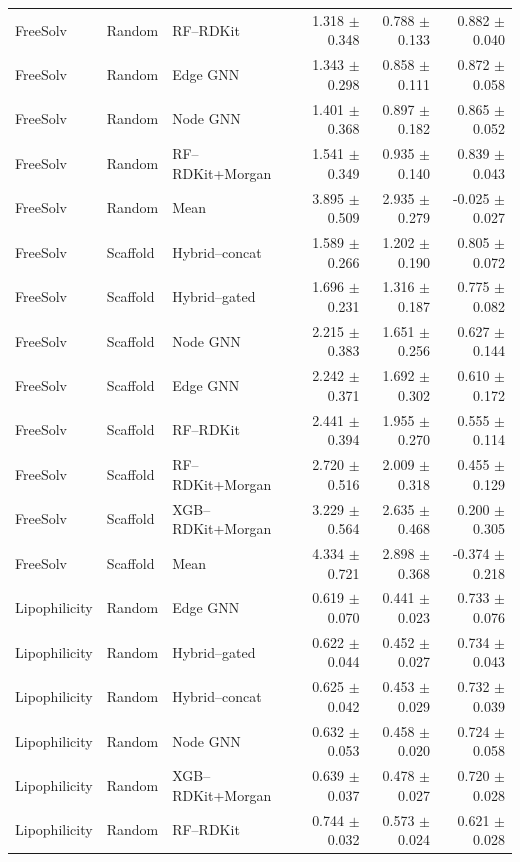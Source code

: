 \begin{tabular}{lllrrr}
FreeSolv & Random & RF--RDKit & 1.318 $\pm$ 0.348 & 0.788 $\pm$ 0.133 & 0.882 $\pm$ 0.040 \\
FreeSolv & Random & Edge GNN & 1.343 $\pm$ 0.298 & 0.858 $\pm$ 0.111 & 0.872 $\pm$ 0.058 \\
FreeSolv & Random & Node GNN & 1.401 $\pm$ 0.368 & 0.897 $\pm$ 0.182 & 0.865 $\pm$ 0.052 \\
FreeSolv & Random & RF--RDKit+Morgan & 1.541 $\pm$ 0.349 & 0.935 $\pm$ 0.140 & 0.839 $\pm$ 0.043 \\
FreeSolv & Random & Mean & 3.895 $\pm$ 0.509 & 2.935 $\pm$ 0.279 & -0.025 $\pm$ 0.027 \\
FreeSolv & Scaffold & Hybrid--concat & 1.589 $\pm$ 0.266 & 1.202 $\pm$ 0.190 & 0.805 $\pm$ 0.072 \\
FreeSolv & Scaffold & Hybrid--gated & 1.696 $\pm$ 0.231 & 1.316 $\pm$ 0.187 & 0.775 $\pm$ 0.082 \\
FreeSolv & Scaffold & Node GNN & 2.215 $\pm$ 0.383 & 1.651 $\pm$ 0.256 & 0.627 $\pm$ 0.144 \\
FreeSolv & Scaffold & Edge GNN & 2.242 $\pm$ 0.371 & 1.692 $\pm$ 0.302 & 0.610 $\pm$ 0.172 \\
FreeSolv & Scaffold & RF--RDKit & 2.441 $\pm$ 0.394 & 1.955 $\pm$ 0.270 & 0.555 $\pm$ 0.114 \\
FreeSolv & Scaffold & RF--RDKit+Morgan & 2.720 $\pm$ 0.516 & 2.009 $\pm$ 0.318 & 0.455 $\pm$ 0.129 \\
FreeSolv & Scaffold & XGB--RDKit+Morgan & 3.229 $\pm$ 0.564 & 2.635 $\pm$ 0.468 & 0.200 $\pm$ 0.305 \\
FreeSolv & Scaffold & Mean & 4.334 $\pm$ 0.721 & 2.898 $\pm$ 0.368 & -0.374 $\pm$ 0.218 \\
Lipophilicity & Random & Edge GNN & 0.619 $\pm$ 0.070 & 0.441 $\pm$ 0.023 & 0.733 $\pm$ 0.076 \\
Lipophilicity & Random & Hybrid--gated & 0.622 $\pm$ 0.044 & 0.452 $\pm$ 0.027 & 0.734 $\pm$ 0.043 \\
Lipophilicity & Random & Hybrid--concat & 0.625 $\pm$ 0.042 & 0.453 $\pm$ 0.029 & 0.732 $\pm$ 0.039 \\
Lipophilicity & Random & Node GNN & 0.632 $\pm$ 0.053 & 0.458 $\pm$ 0.020 & 0.724 $\pm$ 0.058 \\
Lipophilicity & Random & XGB--RDKit+Morgan & 0.639 $\pm$ 0.037 & 0.478 $\pm$ 0.027 & 0.720 $\pm$ 0.028 \\
Lipophilicity & Random & RF--RDKit & 0.744 $\pm$ 0.032 & 0.573 $\pm$ 0.024 & 0.621 $\pm$ 0.028 \\

\end{tabular}
